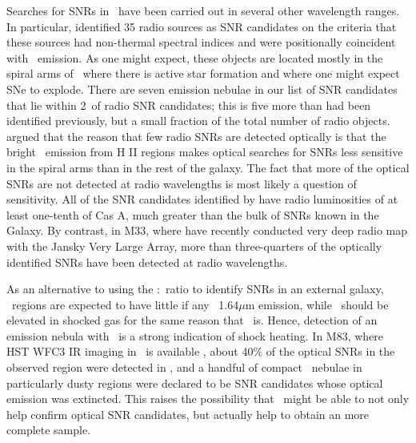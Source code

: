 Searches for SNRs in \gal\ have been carried out in several other wavelength ranges.  In particular,  \cite{lacey01} identified 35 radio sources as SNR candidates on the criteria that these sources had non-thermal spectral indices and were positionally coincident with \ha\ emission.  As one might expect, these objects are located mostly in the spiral arms of \gal\ where there is active star formation and where one might expect SNe to explode.  There are seven emission nebulae in our list of SNR candidates that lie within 2\arcsec\ of radio SNR candidates; this is five more than had been identified previously, but a small fraction of the total number of radio objects.  \cite{lacey01} argued that the reason that few radio SNRs are detected optically is that the bright \ha\ emission from H II regions makes optical searches for SNRs less sensitive in the spiral arms than in the rest of the galaxy.  The fact that more of the optical SNRs are not detected at radio wavelengths is most likely a question of sensitivity.  All of the SNR candidates identified by \cite{lacey01} have radio luminosities of at least one-tenth of Cas A, much greater than the bulk of SNRs known in the Galaxy.  By contrast, in M33, where \cite{white19} have recently conducted very deep radio map with the Jansky Very Large Array, more than three-quarters of the optically identified SNRs have been detected at radio wavelengths.

As an alternative to using the \sii:\ha\ ratio to identify SNRs in an external galaxy, \hii\ regions are expected to have little if any \feii\ 1.64$\mu$m emission, while \feii\ should be elevated in shocked gas for the same reason that \sii\ is.  Hence, detection of an emission nebula with \feii\ is a strong indication of shock heating. In M83, where HST WFC3 IR imaging in \feii\ is available \citep{blair14}, about 40\% of the optical SNRs in the observed region were detected in \feii, and a handful of compact \feii\ nebulae in particularly dusty regions were declared to be SNR candidates whose optical emission was extincted. This raises the possibility that \feii\ might be able to not only help confirm optical SNR candidates, but actually help to obtain an more complete sample.

